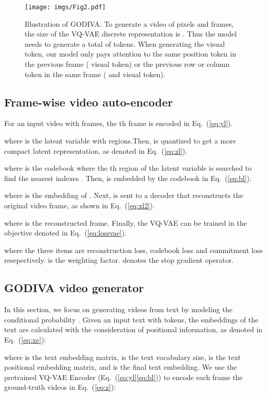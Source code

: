\documentclass{article}
\begin{document}
\begin{figure*}[t]
	\centering
	\texttt{[image: imgs/Fig2.pdf]}
	\caption{Illustration of GODIVA. To generate a video of  pixels and   frames, the size of the VQ-VAE discrete representation is . Thus the model needs to generate a total of  tokens. When generating the  visual token, our model only pays attention to the same position token in the previous frame ( visual token) or the previous row or column token in the same frame ( and  visual token).}
	\label{fig:big}
\end{figure*}



\subsection{Frame-wise video auto-encoder} \label{sec:fva}
For an input video  with  frames, the th frame  is encoded in Eq.~(\ref{eq:yl}).


where  is the latent variable with  regions.Then,  is quantized to get a more compact latent representation, as denoted in Eq.~(\ref{eq:zl}).

where  is the codebook where the th region of the latent variable  is searched to find the nearest indexes . Then, is embedded by the codebook in Eq.~(\ref{eq:bl}).


where   is the embedding of . Next,  is sent to a decoder that reconstructs the original video frame, as shown in Eq.~(\ref{eq:xl2}).

where  is the reconstructed frame. Finally, the  VQ-VAE can be trained in the objective denoted in Eq.~(\ref{eq:lossvae}).

where the three items are reconstruction loss, codebook loss and commitment loss resepectively.  is the weighting factor. denotes the stop gradient operator.

\subsection{GODIVA video generator} \label{sec:GODIVA}

In this section, we focus on generating videos from text by modeling the conditional probability .
Given an input text  with  tokens, the embeddings of the text are calculated with the consideration of positional information, as denoted in Eq.~(\ref{eq:xe}):

where  is the text embedding matrix,  is the text vocabulary size,  is the text positional embedding matrix, and  is the final text embedding. We use the pretrained VQ-VAE Encoder (Eq.~(\ref{eq:yl}\ref{eq:bl})) to encode each frame the ground-truth videos in  Eq.~(\ref{eq:z}):
\end{document}
